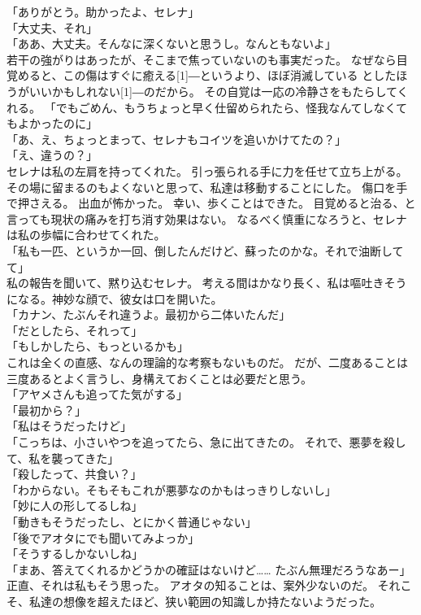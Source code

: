 \documentclass[../IHMain]{subfiles}
\begin{document}
「ありがとう。助かったよ、セレナ」\\
「大丈夫、それ」\\
「ああ、大丈夫。そんなに深くないと思うし。なんともないよ」\\
若干の強がりはあったが、そこまで焦っていないのも事実だった。
なぜなら目覚めると、この傷はすぐに癒える\scalebox{3}[1]{―}というより、ほぼ消滅している
としたほうがいいかもしれない\scalebox{3}[1]{―}のだから。
その自覚は一応の冷静さをもたらしてくれる。
「でもごめん、もうちょっと早く仕留められたら、怪我なんてしなくてもよかったのに」\\
「あ、え、ちょっとまって、セレナもコイツを追いかけてたの？」\\
「え、違うの？」\\
セレナは私の左肩を持ってくれた。
引っ張られる手に力を任せて立ち上がる。
その場に留まるのもよくないと思って、私達は移動することにした。
傷口を手で押さえる。
出血が怖かった。
幸い、歩くことはできた。
目覚めると治る、と言っても現状の痛みを打ち消す効果はない。
なるべく慎重になろうと、セレナは私の歩幅に合わせてくれた。\\
「私も一匹、というか一回、倒したんだけど、蘇ったのかな。それで油断してて」\\
私の報告を聞いて、黙り込むセレナ。
考える間はかなり長く、私は嘔吐きそうになる。神妙な顔で、彼女は口を開いた。\\
「カナン、たぶんそれ違うよ。最初から二体いたんだ」\\
「だとしたら、それって」\\
「もしかしたら、もっといるかも」\\
これは全くの直感、なんの理論的な考察もないものだ。
だが、二度あることは三度あるとよく言うし、身構えておくことは必要だと思う。\\
「アヤメさんも追ってた気がする」\\
「最初から？」\\
「私はそうだったけど」\\
「こっちは、小さいやつを追ってたら、急に出てきたの。
それで、悪夢を殺して、私を襲ってきた」\\
「殺したって、共食い？」\\
「わからない。そもそもこれが悪夢なのかもはっきりしないし」\\
「妙に人の形してるしね」\\
「動きもそうだったし、とにかく普通じゃない」\\
「後でアオタにでも聞いてみよっか」\\
「そうするしかないしね」\\
「まあ、答えてくれるかどうかの確証はないけど……
たぶん無理だろうなあー」
正直、それは私もそう思った。
アオタの知ることは、案外少ないのだ。
それこそ、私達の想像を超えたほど、狭い範囲の知識しか持たないようだった。\\
\end{document}
